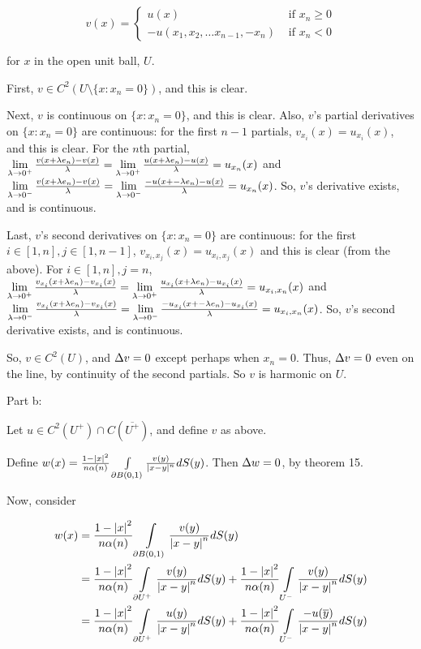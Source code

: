 \documentclass[a4paper,12pt]{article}
\begin{document}
\begin{displaymath}
v(x) =
   \left\{
     \begin{array}{lr}
       u(x) & \text{ if } x_n \geq 0\\
       -u(x_1,x_2, \ldots x_{n-1}, -x_n) & \text{ if } x_n < 0
     \end{array}
   \right.
\end{displaymath}

for $x$ in the open unit ball, $U$.

First, $v \in C^2( U \setminus \{x: x_n = 0\})$, and this is clear.

Next, $v$ is continuous on $\{x: x_n = 0\}$, and this is clear. Also, $v$'s partial derivatives on $\{x: x_n = 0\}$ are continuous: for the first $n-1$ partials, $v_{x_i}(x) = u_{x_i}(x)$, and this is clear. For the $n$th partial, $\lim\limits_{\lambda \to 0^+} \frac{v(x + \lambda e_n) - v(x)}{\lambda} = \lim\limits_{\lambda \to 0^+} \frac{u(x + \lambda e_n) - u(x)}{\lambda} = u_{x_n}(x)$ and $\lim\limits_{\lambda \to 0^-} \frac{v(x + \lambda e_n) - v(x)}{\lambda} = \lim\limits_{\lambda \to 0^-} \frac{-u(x + -\lambda e_n) - u(x)}{\lambda} = u_{x_n}(x)$. So, $v$'s derivative exists, and is continuous.

Last, $v$'s second derivatives on $\{x: x_n = 0\}$ are continuous: for the first $i \in [1,n], j \in [1,n-1]$, $v_{x_i, x_j}(x) = u_{x_i, x_j}(x)$ and this is clear (from the above). For $i \in [1,n], j = n$, $\lim\limits_{\lambda \to 0^+} \frac{v_{x_i}(x + \lambda e_n) - v_{x_i}(x)}{\lambda} = \lim\limits_{\lambda \to 0^+} \frac{u_{x_i}(x + \lambda e_n) - u_{x_i}(x)}{\lambda} = u_{x_i,x_n}(x)$ and $\lim\limits_{\lambda \to 0^-} \frac{v_{x_i}(x + \lambda e_n) - v_{x_i}(x)}{\lambda} = \lim\limits_{\lambda \to 0^-} \frac{-u_{x_i}(x + -\lambda e_n) - u_{x_i}(x)}{\lambda} = u_{x_i,x_n}(x)$. So, $v$'s second derivative exists, and is continuous.

So, $v \in C^2(U)$, and $\Delta v = 0$ except perhaps when $x_n = 0$. Thus, $\Delta v = 0$ even on the line, by continuity of the second partials. So $v$ is harmonic on $U$.

\shunt

Part b:

Let $u \in C^2(U^+) \cap C(\overline{U^+})$, and define $v$ as above.

Define $w(x) = \frac{1-\left\lvert x \right\rvert^2}{n \alpha(n)} \int\limits_{\partial B(0,1)} \frac{v(y)}{\left\lvert x-y \right\rvert^n} dS(y)$. Then $\Delta w = 0$, by theorem 15.

Now, consider

\begin{align*}
w(x) &= \frac{1-\left\lvert x \right\rvert^2}{n \alpha(n)} \int\limits_{\partial B(0,1)} \frac{v(y)}{\left\lvert x-y \right\rvert^n} dS(y)\\
&= \frac{1-\left\lvert x \right\rvert^2}{n \alpha(n)} \int\limits_{\partial U^+} \frac{v(y)}{\left\lvert x-y \right\rvert^n} dS(y) + \frac{1-\left\lvert x \right\rvert^2}{n \alpha(n)} \int\limits_{U^-} \frac{v(y)}{\left\lvert x-y \right\rvert^n} dS(y)\\
&= \frac{1-\left\lvert x \right\rvert^2}{n \alpha(n)} \int\limits_{\partial U^+} \frac{u(y)}{\left\lvert x-y \right\rvert^n} dS(y) + \frac{1-\left\lvert x \right\rvert^2}{n \alpha(n)} \int\limits_{U^-} \frac{-u(\overline{y})}{\left\lvert x-y \right\rvert^n} dS(y)\\
\end{align*}
\end{document}
